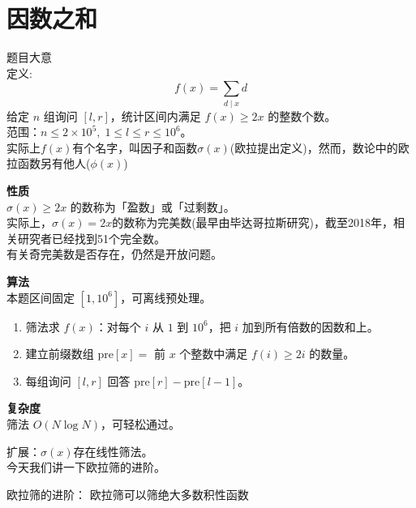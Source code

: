 \documentclass[11pt]{beamer}
\begin{document}
\section{因数之和}
\begin{frame}
题目大意\\
定义: $$f(x)=\sum_{d\mid x}d$$
给定 $n$ 组询问 $[l,r]$，统计区间内满足 $f(x)\ge 2x$ 的整数个数。\\
范围：$n\le 2\times10^5,\;1\le l\le r\le 10^6$。\\
实际上$f(x)$有个名字，叫因子和函数$\sigma(x)$(欧拉提出定义)，然而，数论中的欧拉函数另有他人($\phi(x)$)

\end{frame}

\begin{frame}
\textbf{性质}\\
$\sigma(x)\ge 2x$ 的数称为「盈数」或「过剩数」。\\
实际上，$\sigma(x) = 2x$的数称为完美数(最早由毕达哥拉斯研究)，截至2018年，相关研究者已经找到51个完全数。\\
有关奇完美数是否存在，仍然是开放问题。
\end{frame}

\begin{frame}
\textbf{算法}\\
本题区间固定 $[1,10^6]$，可离线预处理。\\
\begin{enumerate}
  \item 筛法求 $f(x)$：对每个 $i$ 从 $1$ 到 $10^6$，把 $i$ 加到所有倍数的因数和上。
  \item 建立前缀数组 $\text{pre}[x]=$ 前 $x$ 个整数中满足 $f(i)\ge 2i$ 的数量。
  \item 每组询问 $[l,r]$ 回答 $\text{pre}[r]-\text{pre}[l-1]$。
\end{enumerate}
\end{frame}

\begin{frame}
\textbf{复杂度}\\
筛法 $O(N \log N)$，可轻松通过。
\end{frame}

\begin{frame}
扩展：$\sigma(x)$存在线性筛法。\\
今天我们讲一下欧拉筛的进阶。
\end{frame}

\begin{frame}
欧拉筛的进阶：
欧拉筛可以筛绝大多数$\textbf{积性函数}$
\end{frame}
\end{document}
